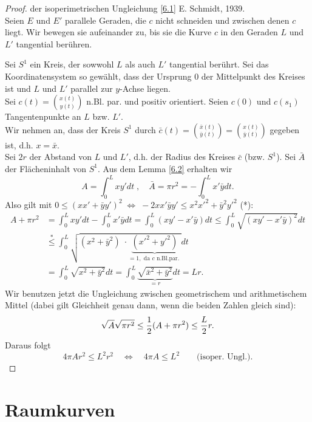 \documentclass[11pt]{scrbook}
\newcommand{\vekt}[2]{\binom{#1}{#2}}   	%
\begin{document}
\begin{proof}{der isoperimetrischen Ungleichung \ref {6.1}}
E. Schmidt, 1939. \\
Seien $E$ und $E'$ parallele Geraden, die $c$ nicht schneiden und zwischen denen $c$ liegt. Wir bewegen sie aufeinander zu, bis sie die Kurve $c$ in den Geraden $L$ und $L'$ tangential berühren.

Sei $S^1$ ein Kreis, der sowwohl $L$ als auch $L'$ tangential berührt. Sei das Koordinatensystem so gewählt, dass der Ursprung $0$ der Mittelpunkt des Kreises ist und $L$ und $L'$ parallel zur $y$-Achse liegen. \\
Sei $c(t) = \vekt{x(t)}{y(t)}$ n.Bl. par. und positiv orientiert. Seien $c(0)$ und $c(s_1)$ Tangentenpunkte an $L$ bzw. $L'$. \\
{\color{orange} Wir nehmen an, dass der Kreis $S^1$ durch $ \bar{c}(t) = \vekt{\bar{x}(t)}{\bar{y}(t)} = \vekt{x(t)}{\bar{y}(t)}$ gegeben ist, d.h. $x = \bar {x}$.} \\ 
Sei $2 r$ der Abstand von $L$ und $L'$, d.h. der Radius des Kreises $\bar{c}$ (bzw. $S^1$). Sei $\bar{A}$ der Flächeninhalt von $S^1$. Aus dem Lemma \ref{6.2} erhalten wir 
\[ A = \int_0^L x y' dt \; , \quad \bar{A} = \pi r^2 = - \int_0^L x' \bar{y} dt. \]
Also gilt mit  $0 \leq (x x' + \bar{y} y')^2 \; \Leftrightarrow \; - 2 x x' \bar{y} y' \leq x^2 x'^2 + \bar{y}^2 y'^2$ (*):
\begin{align*}
A + \pi r^2 &= \int_0^L x y' dt - \int_0^L x' \bar{y} dt = \int_0^L (x y' - x' \bar{y}) dt \leq \int_0^L \sqrt{(x y' - x' \bar{y})^2} dt \\
&\stackrel{*}{\leq} \int_0^L \sqrt{(x^2 + \bar{y}^2) \; \cdot \underbrace{(x'^2 + y'^2)}_{= 1, \text{ da $c$ n.Bl.par. }}} dt  \\
&= \int_0^L \sqrt{x^2 + \bar{y}^2} dt = \int_0^L \underbrace{\sqrt{\bar{x}^2 + \bar{y}^2}}_{= r} dt = Lr.
\end{align*}
Wir benutzen jetzt die Ungleichung zwischen geometrischem und arithmetischem Mittel (dabei gilt Gleichheit genau dann, wenn die beiden Zahlen gleich sind):
\[ \sqrt{A} \sqrt{\pi r^2} \leq \frac{1}{2} (A + \pi r^2) \leq \frac{L}{2} r. \]
Daraus folgt 
\[ 4 \pi A r^2 \leq L^2 r^2 \quad  \Longleftrightarrow \quad 4 \pi A \leq L^2  \qquad \text{(isoper. Ungl.)} .\]

\end{proof}


\section{Raumkurven}
\end{document}
